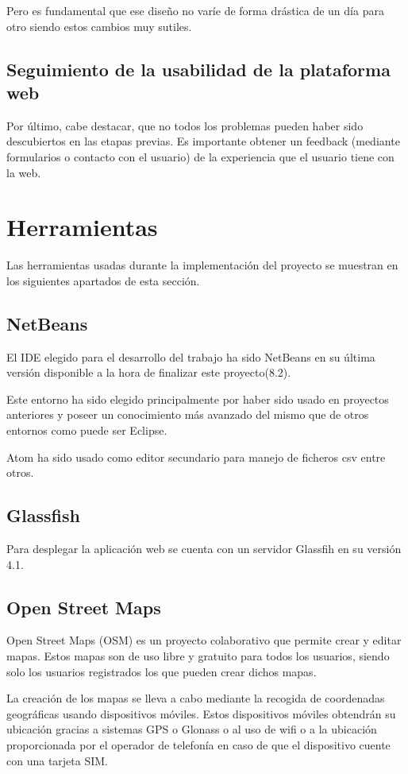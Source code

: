 Pero es fundamental que ese diseño no varíe de forma drástica de un día para otro siendo estos cambios muy sutiles.

\subsection{Seguimiento de la usabilidad de la plataforma web}

Por último, cabe destacar, que no todos los problemas pueden haber sido descubiertos en las etapas previas. Es importante obtener un feedback (mediante formularios o contacto con el usuario) de la experiencia que el usuario tiene con la web.

\section{Herramientas}
Las herramientas usadas durante la implementación del proyecto se muestran en los siguientes apartados de esta sección.

\subsection{NetBeans}
El IDE elegido para el desarrollo del trabajo ha sido NetBeans en su última versión disponible a la hora de finalizar este proyecto(8.2).

Este entorno ha sido elegido principalmente por haber sido usado en proyectos anteriores y poseer un conocimiento más avanzado del mismo que de otros entornos como puede ser Eclipse.

Atom ha sido usado como editor secundario para manejo de ficheros csv entre otros.

\subsection{Glassfish}
Para desplegar la aplicación web se cuenta con un servidor Glassfih en su versión 4.1.

\subsection{Open Street Maps}
Open Street Maps (OSM) es un proyecto colaborativo que permite crear y editar mapas. Estos mapas son de uso libre y gratuito para todos los usuarios, siendo solo los usuarios registrados los que pueden crear dichos mapas.

La creación de los mapas se lleva a cabo mediante la recogida de coordenadas geográficas usando dispositivos móviles. Estos dispositivos móviles obtendrán su ubicación gracias a sistemas GPS o Glonass o al uso de wifi o a la ubicación proporcionada por el operador de telefonía en caso de que el dispositivo cuente con una tarjeta SIM.

